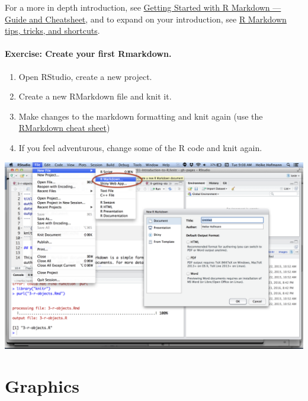 \documentclass[
]{book}
\providecommand{\tightlist}{%
  \setlength{\itemsep}{0pt}\setlength{\parskip}{0pt}}
\begin{document}
For a more in depth introduction, see \href{https://www.dataquest.io/blog/r-markdown-guide-cheatsheet/?utm_source=rbloggers\&utm_medium=referral\&utm_campaign=affiliate}{Getting Started with R Markdown --- Guide and Cheatsheet}, and to expand on your introduction, see \href{https://www.dataquest.io/blog/r-markdown-tips-tricks-and-shortcuts/?utm_source=rbloggers\&utm_medium=referral\&utm_campaign=affiliate}{R Markdown tips, tricks, and shortcuts}.

\hypertarget{exercise-create-your-first-rmarkdown.}{%
\subsubsection*{Exercise: Create your first Rmarkdown.}\label{exercise-create-your-first-rmarkdown.}}

\begin{enumerate}
\def\labelenumi{\arabic{enumi}.}
\tightlist
\item
  Open RStudio, create a new project.
\item
  Create a new RMarkdown file and knit it.
\item
  Make changes to the markdown formatting and knit again (use the \href{https://www.rstudio.com/resources/cheatsheets/}{RMarkdown cheat sheet})
\item
  If you feel adventurous, change some of the R code and knit again.
\end{enumerate}

\includegraphics[width=24in]{img/hello-rmarkdown}

\hypertarget{graphics}{%
\chapter{Graphics}\label{graphics}}
\end{document}
